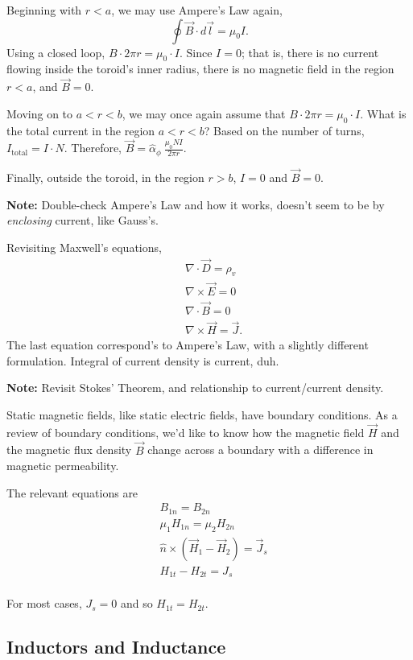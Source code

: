 \documentclass{article}
\begin{document}
Beginning with \(r<a\), we may use Ampere's Law again, 
\[
  \oint \vec{B} \cdot d \vec{l} = \mu_0 I.
\]
Using a closed loop, \(B \cdot 2\pi r = \mu_0 \cdot I\). Since \(I=0\); that is, there is no current flowing inside the toroid's inner radius, there is no magnetic field in the region \(r<a\), and \(\vec{B} = 0\).

Moving on to \(a<r<b\), we may once again assume that \(B\cdot 2\pi r = \mu_0 \cdot I\). What is the total current in the region \(a < r < b\)? Based on the number of turns, \(I_{\mathrm{total}} = I \cdot N\). Therefore, \(\vec{B} = \hat{\alpha}_\phi\ \frac{\mu_0 N I}{2\pi r}\). 

Finally, outside the toroid, in the region \(r > b\), \(I=0\) and \(\vec{B}=0\). 

\textbf{Note:} Double-check Ampere's Law and how it works, doesn't seem to be by \textit{enclosing} current, like Gauss's.

Revisiting Maxwell's equations, 
\begin{align*}
	& \nabla \cdot \vec{D} = \rho_v \\
	& \nabla \times \vec{E} = 0 \\
	& \nabla \cdot \vec{B} = 0 \\
	& \nabla \times \vec{H} = \vec{J}.
\end{align*}
The last equation correspond's to Ampere's Law, with a slightly different formulation. Integral of current density is current, duh. 

\textbf{Note:} Revisit Stokes' Theorem, and relationship to current/current density.

Static magnetic fields, like static electric fields, have boundary conditions. As a review of boundary conditions, we'd like to know how the magnetic field \(\vec{H}\) and the magnetic flux density \(\vec{B}\) change across a boundary with a difference in magnetic permeability.

The relevant equations are
\begin{align*}
	& B_{1n} = B_{2n} \\
	& \mu_1H_{1n} = \mu_2H_{2n} \\
	& \hat{n} \times (\vec{H}_1 - \vec{H}_2) = \vec{J}_s \\
	& H_{1t} - H_{2t} = J_s \\
\end{align*}

For most cases, \(J_s = 0\) and so \(H_{1t} = H_{2t}\).

\subsection{Inductors and Inductance}
\end{document}
